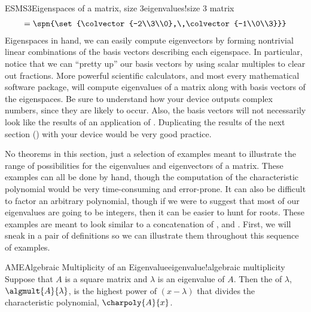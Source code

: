 \begin{example}{ESMS3}{Eigenspaces of a matrix, size 3}{eigenvalues!size 3 matrix}
\begin{align*}
=\spn{\set{\colvector{-2\\3\\0},\,\colvector{-1\\0\\3}}}
%
\end{align*}
%
Eigenspaces in hand, we can easily compute eigenvectors by forming nontrivial linear combinations of the basis vectors describing each eigenspace.  In particular, notice that we can ``pretty up'' our basis vectors by using scalar multiples to clear out fractions.
%
{More powerful scientific calculators, and most every mathematical software package, will compute eigenvalues of a matrix along with basis vectors of the eigenspaces.  Be sure to understand how your device outputs complex numbers, since they are likely to occur.  Also, the basis vectors will not necessarily look like the results of an application of .  Duplicating the results of the next section () with your device would be very good practice.}
{
{}{\relax}%
}{
%
}
%
\end{example}
%
%
No theorems in this section, just a selection of examples meant to illustrate the range of possibilities for the eigenvalues and eigenvectors of a matrix.  These examples can all be done by hand, though the computation of the characteristic polynomial would be very time-consuming and error-prone.  It can also be difficult to factor an arbitrary polynomial, though if we were to suggest that most of our eigenvalues are going to be integers, then it can be easier to hunt for roots.  These examples are meant to look similar to a concatenation of ,  and .  First, we will sneak in a pair of definitions so we can illustrate them throughout this sequence of examples.
%
\begin{definition}{AME}{Algebraic Multiplicity of an Eigenvalue}{eigenvalue!algebraic multiplicity}
Suppose that $A$ is a square matrix and $\lambda$ is an eigenvalue of $A$.  Then the  of $\lambda$, $\algmult{A}{\lambda}$, is the highest power of $(x-\lambda)$ that divides the characteristic polynomial, $\charpoly{A}{x}$.
\end{definition}
